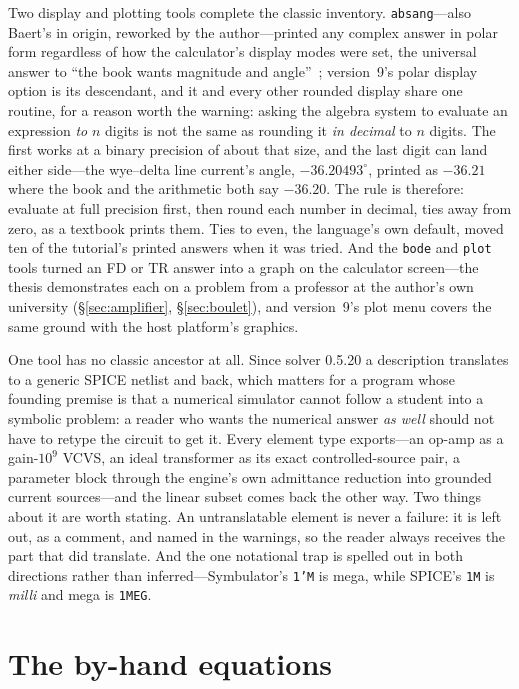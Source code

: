 \documentclass[11pt,oneside]{report}
\newcommand{\code}[1]{\texttt{#1}}
\begin{document}
Two display and plotting tools complete the classic
inventory. \code{absang}---also Baert's in origin, reworked by the
author---printed any complex answer in polar form regardless of how
the calculator's display modes were set, the universal answer to
``the book wants magnitude and angle''~\cite[\S6.1.2]{thesis2000};
version~9's polar display option is its descendant, and it and every
other rounded display share one routine, for a reason worth the
warning: asking the algebra system to evaluate an expression \emph{to}
$n$ digits is not the same as rounding it \emph{in decimal} to $n$
digits. The first works at a binary precision of about that size, and
the last digit can land either side---the wye--delta line current's
angle, $-36.20493^\circ$, printed as $-36.21$ where the book and the
arithmetic both say $-36.20$. The rule is therefore: evaluate at full
precision first, then round each number in decimal, ties away from
zero, as a textbook prints them. Ties to even, the language's own
default, moved ten of the tutorial's printed answers when it was
tried. And the
\code{bode} and \code{plot} tools turned an FD or TR answer into a
graph on the calculator screen---the thesis demonstrates each on a
problem from a professor at the author's own university
(\S\ref{sec:amplifier}, \S\ref{sec:boulet}), and version~9's plot
menu covers the same ground with the host platform's graphics.

One tool has no classic ancestor at all. Since solver 0.5.20 a
description translates to a generic SPICE netlist and back, which
matters for a program whose founding premise is that a numerical
simulator cannot follow a student into a symbolic problem: a reader
who wants the numerical answer \emph{as well} should not have to
retype the circuit to get it. Every element type exports---an op-amp
as a gain-$10^9$ VCVS, an ideal transformer as its exact
controlled-source pair, a parameter block through the engine's own
admittance reduction into grounded current sources---and the linear
subset comes back the other way. Two things about it are worth
stating. An untranslatable element is never a failure: it is left out,
as a comment, and named in the warnings, so the reader always receives
the part that did translate. And the one notational trap is spelled
out in both directions rather than inferred---Symbulator's \code{1'M}
is mega, while SPICE's \code{1M} is \emph{milli} and mega is
\code{1MEG}.

\section{The by-hand equations}
\label{sec:byhand}
\end{document}
